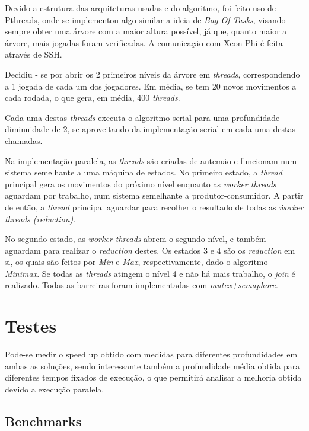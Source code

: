 \documentclass[12pt,a4paper,final]{article}
\begin{document}
Devido a estrutura das arquiteturas usadas e do algoritmo, foi feito uso de Pthreads, onde se implementou algo similar a ideia de \textit{Bag Of Tasks}, visando sempre obter uma árvore com a maior altura possível, já que, quanto maior a árvore, mais jogadas foram verificadas. A comunicação com Xeon Phi é feita através de SSH.

Decidiu - se por abrir os 2 primeiros níveis da árvore em \textit{threads}, correspondendo a 1 jogada de cada um dos jogadores. Em média, se tem 20 novos movimentos a cada rodada, o que gera, em média, 400 \textit{threads}.

Cada uma destas \textit{threads} executa o algoritmo serial para uma profundidade diminuidade de 2, se aproveitando da implementação serial em cada uma destas chamadas.

Na implementação paralela, as \textit{threads} são criadas de antemão e funcionam num sistema semelhante a uma máquina de estados. No primeiro estado, a \textit{thread} principal gera os movimentos do próximo nível enquanto as \textit{worker threads} aguardam por trabalho, num sistema semelhante a produtor-consumidor. A partir de então, a \textit{thread} principal aguardar para recolher o resultado de todas as \textit{ẁorker threads (reduction)}.

No segundo estado, as \textit{worker threads} abrem o segundo nível, e também aguardam para realizar o \textit{reduction} destes. Os estados 3 e 4 são os \textit{reduction} em si, os quais são feitos por \textit{Min} e \textit{Max}, respectivamente, dado o algoritmo \textit{Minimax}. Se todas as \textit{threads} atingem o nível 4 e não há mais trabalho, o \textit{join} é realizado. Todas as barreiras foram implementadas com \textit{mutex+semaphore}.

\section{Testes}

Pode-se medir o speed up obtido com medidas para diferentes profundidades em ambas as soluções, sendo interessante também a profundidade média obtida para diferentes tempos fixados de execução, o que permitirá analisar a melhoria obtida devido a execução paralela.

\subsection{Benchmarks}


%  
%
%
\end{document}
